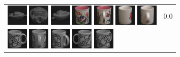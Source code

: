 \begin{figure}[tbp]
\begin{center}
\begin{tabular}{m{11cm} | m{3cm} |}
\includegraphics[width=1cm]{coil/beeld-27.eps}
\includegraphics[width=1cm]{coil/beeld-26.eps}
\includegraphics[width=1cm]{coil/beeld-29.eps}
\includegraphics[width=1cm]{coil/beeld-8.eps}
\includegraphics[width=1cm]{coil/beeld-11.eps}
\includegraphics[width=1cm]{coil/beeld-38.eps}
\includegraphics[width=1cm]{coil/beeld-41.eps}
& {\scriptsize 0.0}
\\
\includegraphics[width=1cm]{coil/beeld-48.eps}
\includegraphics[width=1cm]{coil/beeld-50.eps}
\includegraphics[width=1cm]{coil/beeld-49.eps}
\includegraphics[width=1cm]{coil/beeld-51.eps}
\includegraphics[width=1cm]{coil/beeld-53.eps}

\end{tabular}
\end{center}
\end{figure}
